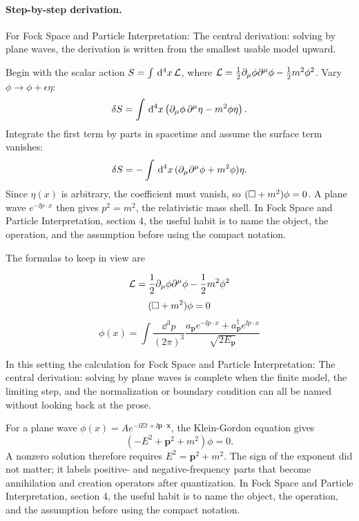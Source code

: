 \paragraph{Step-by-step derivation.}

For Fock Space and Particle Interpretation: The central derivation: solving by plane waves, the derivation is written from the smallest usable model upward.

Begin with the scalar action \(S=\int\,\mathrm d^4x\,\mathcal L\), where \(\mathcal L=\frac12\partial_\mu\phi\partial^\mu\phi-\frac12m^2\phi^2\).  Vary \(\phi\to\phi+\epsilon\eta\):
\[
  \delta S=\int\,\mathrm d^4x\left(\partial_\mu\phi\,\partial^\mu\eta-m^2\phi\eta\right).
\]
Integrate the first term by parts in spacetime and assume the surface term vanishes:
\[
  \delta S=-\int\,\mathrm d^4x\,(\partial_\mu\partial^\mu\phi+m^2\phi)\eta.
\]
Since \(\eta(x)\) is arbitrary, the coefficient must vanish, so \((\Box+m^2)\phi=0\).  A plane wave \(e^{-\ii p\cdot x}\) then gives \(p^2=m^2\), the relativistic mass shell.  In Fock Space and Particle Interpretation, section 4, the useful habit is to name the object, the operation, and the assumption before using the compact notation.

The formulas to keep in view are

\[
  \mathcal L=\frac12\partial_\mu\phi\partial^\mu\phi-\frac12m^2\phi^2
\]
\[
  (\Box+m^2)\phi=0
\]
\[
  \phi(x)=\int\frac{\dd^3p}{(2\pi)^3}\frac{a_{\bm p}e^{-\ii p\cdot x}+a_{\bm p}^\dagger e^{\ii p\cdot x}}{\sqrt{2E_{\bm p}}}
\]

In this setting the calculation for Fock Space and Particle Interpretation: The central derivation: solving by plane waves is complete when the finite model, the limiting step, and the normalization or boundary condition can all be named without looking back at the prose.




\begin{example}
For a plane wave \(\phi(x)=Ae^{-\ii Et+\ii\bm p\cdot\bm x}\), the Klein-Gordon equation gives
\[
  (-E^2+\bm p^2+m^2)\phi=0.
\]
A nonzero solution therefore requires \(E^2=\bm p^2+m^2\).  The sign of the exponent did not matter; it labels positive- and negative-frequency parts that become annihilation and creation operators after quantization.  In Fock Space and Particle Interpretation, section 4, the useful habit is to name the object, the operation, and the assumption before using the compact notation.
\end{example}



